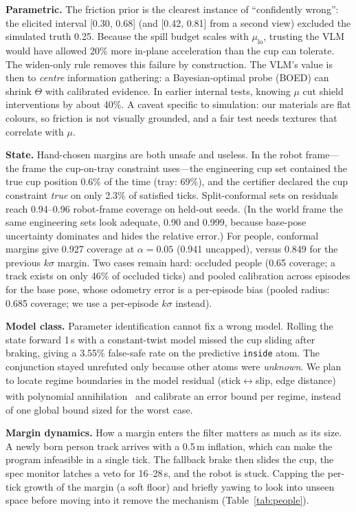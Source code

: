 \documentclass[10pt,twocolumn,letterpaper]{article}
\newcommand{\tv}{\textsuperscript{\dag}}  %
\begin{document}
\textbf{Parametric.} The friction prior is the clearest instance of ``confidently wrong'': the elicited interval [0.30, 0.68] (and
[0.42, 0.81] from a second view) excluded the simulated truth 0.25. Because the spill budget scales with $\mu_{\mathrm{lo}}$, trusting the
VLM would have allowed 20\% more in-plane acceleration than the cup can tolerate. The widen-only rule removes this failure by
construction. The VLM's value is then to \emph{centre} information gathering: a Bayesian-optimal probe (BOED) can shrink $\Theta$ with
calibrated evidence. In earlier internal tests, knowing $\mu$ cut shield interventions by about 40\%. A caveat specific to simulation:
our materials are flat colours, so friction is not visually grounded, and a fair test needs textures that correlate with $\mu$.

\textbf{State.} Hand-chosen margins are both unsafe and useless. In the robot frame---the frame the cup-on-tray constraint uses---the engineering cup set contained the true cup position 0.6\% of the time (tray: 69\%),
and the certifier declared the cup constraint \emph{true} on only 2.3\% of satisfied ticks. Split-conformal sets on residuals reach
0.94--0.96 robot-frame coverage on held-out seeds. (In the world frame the same engineering sets look adequate, 0.90 and 0.999, because base-pose uncertainty dominates and hides the relative error.) For people, conformal margins give 0.927 coverage at $\alpha{=}0.05$ (0.941 uncapped), versus
0.849 for the previous $k\sigma$ margin. Two cases remain hard: occluded people (0.65 coverage; a track exists on only 46\% of occluded
ticks) and pooled calibration across episodes for the base pose, whose odometry error is a per-episode bias (pooled radius: 0.685 coverage;
we use a per-episode $k\sigma$ instead).

\textbf{Model class.} Parameter identification cannot fix a wrong model. Rolling the state forward 1\,s with a constant-twist model
missed the cup sliding after braking, giving a 3.55\% false-safe rate on the predictive \texttt{inside} atom. The conjunction stayed
unrefuted only because other atoms were \emph{unknown}. We plan to locate regime boundaries in the model residual (stick$\leftrightarrow$slip,
edge distance) with polynomial annihilation~\cite{pa}\tv{} and calibrate an error bound per regime, instead of one global bound sized for the worst case.

\textbf{Margin dynamics.} How a margin enters the filter matters as much as its size. A newly born person track arrives with a 0.5\,m
inflation, which can make the program infeasible in a single tick. The fallback brake then slides the cup, the spec monitor latches a veto
for 16--28\,s, and the robot is stuck. Capping the per-tick growth of the margin (a soft floor) and briefly yawing to look into unseen space
before moving into it remove the mechanism (Table~\ref{tab:people}).
\end{document}
